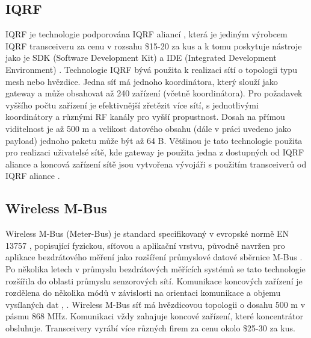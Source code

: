\subsection{IQRF}
IQRF je technologie podporována IQRF aliancí \cite{iqrf_alliance}, která je jediným výrobcem IQRF transceiveru \cite{iqrf_transceivers} za cenu v rozsahu \$15-20 za kus a k tomu poskytuje nástroje jako je SDK (Software Development Kit) \cite{iqrf_sdk} a IDE (Integrated Development Environment) \cite{iqrf_ide}.
Technologie IQRF bývá použita k realizaci sítí o topologii typu mesh nebo hvězdice.
Jedna síť má jednoho koordinátora, který slouží jako gateway a může obsahovat až 240 zařízení (včetně koordinátora). Pro požadavek vyššího počtu zařízení je efektivnější zřetězit více sítí, s jednotlivými koordinátory a různými RF kanály pro vyšší propustnost.
Dosah na přímou viditelnost je až 500 m a velikost datového obsahu (dále v práci uvedeno jako payload) jednoho paketu může být až 64 B.
Většinou je tato technologie použita pro realizaci uživatelsé sítě, kde gateway je použita jedna z dostupných od IQRF aliance a koncová zařízení sítě jsou vytvořena vývojáři s použitím transceiverů od IQRF aliance
\cite{paper_iqrf}.


\subsection{Wireless M-Bus}
Wireless M-Bus (Meter-Bus) je standard specifikovaný v evropské normě EN 13757 \cite{EN 13757}, popisující fyzickou, síťovou a aplikační vrstvu, původně navržen pro aplikace bezdrátového měření jako rozšíření průmyslové datové sběrnice M-Bus \cite{wirelessMBus_automatizace}.
Po několika letech v průmyslu bezdrátových měřících systémů se tato technologie rozšířila do oblasti průmyslu senzorových sítí.
Komunikace koncových zařízení je rozdělena do několika módů v závislosti na orientaci komunikace a objemu vysílaných dat \cite{wirelessMBus01}, \cite{wirelessMBus02}. 
Wireless M-Bus síť má hvězdicovou topologii o dosahu 500 m v pásmu 868 MHz.
Komunikaci vždy zahajuje koncové zařízení, které koncentrátor obsluhuje.
Transceivery vyrábí více různých firem za cenu okolo \$25-30 za kus.


